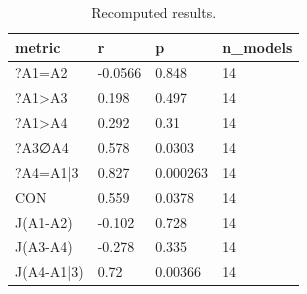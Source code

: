 \begin{table}[!t]
\centering\scriptsize
\begin{tabular}{llll}
\toprule
metric & r & p & n\_models \\
\midrule
?A1=A2 & -0.0566 & 0.848 & 14 \\
?A1>A3 & 0.198 & 0.497 & 14 \\
?A1>A4 & 0.292 & 0.31 & 14 \\
?A3∅A4 & 0.578 & 0.0303 & 14 \\
?A4=A1|3 & 0.827 & 0.000263 & 14 \\
CON & 0.559 & 0.0378 & 14 \\
J(A1-A2) & -0.102 & 0.728 & 14 \\
J(A3-A4) & -0.278 & 0.335 & 14 \\
J(A4-A1|3) & 0.72 & 0.00366 & 14 \\
\bottomrule
\end{tabular}
\caption{Recomputed results.}
\label{tab:Pearson}
\end{table}
